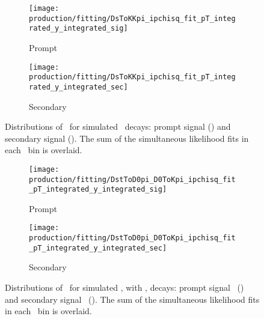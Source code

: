 \begin{figure}
  \begin{subfigure}[b]{0.5\textwidth}
    \centering
    \texttt{[image: production/fitting/DsToKKpi\_ipchisq\_fit\_pT\_integrated\_y\_integrated\_sig]}
    \caption{Prompt}
    \label{fig:prod:fitting:prefits:DsToKKpi:prompt}
  \end{subfigure}
  \begin{subfigure}[b]{0.5\textwidth}
    \centering
    \texttt{[image: production/fitting/DsToKKpi\_ipchisq\_fit\_pT\_integrated\_y\_integrated\_sec]}
    \caption{Secondary}
    \label{fig:prod:fitting:prefits:DsToKKpi:secondary}
  \end{subfigure}
  \caption{%
    Distributions of \lnipchisq\ for simulated \DspTophipi\ decays: prompt 
    signal \PDsplus () and 
    secondary signal \PDsplus 
    ().
    The sum of the simultaneous likelihood fits in each \pTy\ bin is overlaid.
  }
  \label{fig:prod:fitting:prefits:DsToKKpi}
\end{figure}

\begin{figure}
  \begin{subfigure}[b]{0.5\textwidth}
    \centering
    \texttt{[image: production/fitting/DstToD0pi\_D0ToKpi\_ipchisq\_fit\_pT\_integrated\_y\_integrated\_sig]}
    \caption{Prompt}
    \label{fig:prod:fitting:prefits:DstToD0pi_D0ToKpi:prompt}
  \end{subfigure}
  \begin{subfigure}[b]{0.5\textwidth}
    \centering
    \texttt{[image: production/fitting/DstToD0pi\_D0ToKpi\_ipchisq\_fit\_pT\_integrated\_y\_integrated\_sec]}
    \caption{Secondary}
    \label{fig:prod:fitting:prefits:DstToD0pi_D0ToKpi:secondary}
  \end{subfigure}
  \caption{%
    Distributions of \PDzero \lnipchisq\ for simulated \DstToDzpi, with 
    \DzToKpi, decays: prompt signal \PDstarp\
    () and secondary 
    signal \PDstarp\
    ().
    The sum of the simultaneous likelihood fits in each \pTy\ bin is overlaid.
  }
  \label{fig:prod:fitting:prefits:DstToD0pi_D0ToKpi}
\end{figure}

